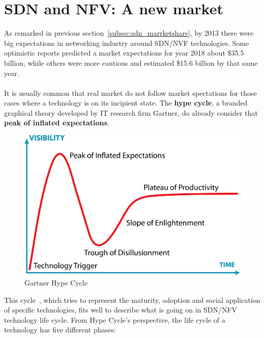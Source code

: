 \documentclass[a4paper, 12pt]{book}
\begin{document}
\section{SDN and NFV: A new market}
\label{sec:odlnewmarket}

As remarked in previous section~\ref{subsec:sdn_marrketshare}, by 2013 there were big expectations in networking industry around SDN/NVF technologies. Some optimistic reports predicted a market expectations for year 2018 about \$35.5 billion, while others were more cautious and estimated \$15.6 billion by that same year.\\
\\
It is usually common that real market do not follow market spectations for those cases where a technology is on its incipient state. The \textbf{hype cycle}, a branded graphical theory developed by IT research firm Gartner, do already consider that \textbf{peak of inflated expectations}.
\begin{center}
 \begin{figure}[H]
 \begin{center}
   \includegraphics[width=15cm]{img/hype-cycle-00.png}
   \caption{Gartner Hype Cycle}
   \label{fig:gartner_hype_cyle}
 \end{center}
 \end{figure}
\end{center}
This cycle~\cite{HypeCycle}, which tries to represent the maturity, adoption and social application of specific technologies, fits well to describe what is going on in SDN/NFV technology life cycle. From Hype Cycle's perspective, the life cycle of a technology has five different phases:
\end{document}
